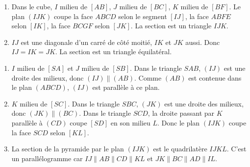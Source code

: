 \begin{enumerate}[label=\alph*)]
\item Dans le cube, $I$ milieu de $[AB]$, $J$ milieu de $[BC]$, $K$ milieu de $[BF]$. Le plan $(IJK)$ coupe la face $ABCD$ selon le segment $[IJ]$, la face $ABFE$ selon $[IK]$, la face $BCGF$ selon $[JK]$. La section est un triangle $IJK$.
\item $IJ$ est une diagonale d'un carré de côté moitié, $IK$ et $JK$ aussi. Donc $IJ=IK=JK$. La section est un triangle équilatéral.
\end{enumerate}

\begin{enumerate}[label=\alph*)]
\item $I$ milieu de $[SA]$ et $J$ milieu de $[SB]$. Dans le triangle $SAB$, $(IJ)$ est une droite des milieux, donc $(IJ)\parallel(AB)$. Comme $(AB)$ est contenue dans le plan $(ABCD)$, $(IJ)$ est parallèle à ce plan.
\item $K$ milieu de $[SC]$. Dans le triangle $SBC$, $(JK)$ est une droite des milieux, donc $(JK)\parallel(BC)$. Dans le triangle $SCD$, la droite passant par $K$ parallèle à $(CD)$ coupe $[SD]$ en son milieu $L$. Donc le plan $(IJK)$ coupe la face $SCD$ selon $[KL]$.
\item La section de la pyramide par le plan $(IJK)$ est le quadrilatère $IJKL$. C'est un parallélogramme car $IJ\parallel AB\parallel CD\parallel KL$ et $JK\parallel BC\parallel AD\parallel IL$.
\end{enumerate}

